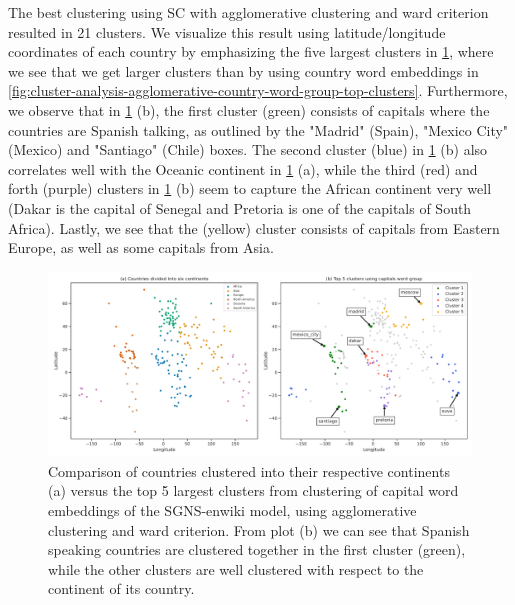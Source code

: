 The best clustering using SC with agglomerative clustering and ward criterion resulted in 21 clusters. We visualize this result using latitude/longitude coordinates of each country by emphasizing the five largest clusters in \cref{fig:cluster-analysis-agglomerative-country-capitals-word-group-top-clusters}, where we see that we get larger clusters than by using country word embeddings in \cref{fig:cluster-analysis-agglomerative-country-word-group-top-clusters}. Furthermore, we observe that in \cref{fig:cluster-analysis-agglomerative-country-capitals-word-group-top-clusters} (b), the first cluster (green) consists of capitals where the countries are Spanish talking, as outlined by the "Madrid" (Spain), "Mexico City" (Mexico) and "Santiago" (Chile) boxes. The second cluster (blue) in \cref{fig:cluster-analysis-agglomerative-country-capitals-word-group-top-clusters} (b) also correlates well with the Oceanic continent in \cref{fig:cluster-analysis-agglomerative-country-capitals-word-group-top-clusters} (a), while the third (red) and forth (purple) clusters in \cref{fig:cluster-analysis-agglomerative-country-capitals-word-group-top-clusters} (b) seem to capture the African continent very well (Dakar is the capital of Senegal and Pretoria is one of the capitals of South Africa). Lastly, we see that the (yellow) cluster consists of capitals from Eastern Europe, as well as some capitals from Asia.
\begin{figure}[H]
    \centering
    \includegraphics[width=\textwidth]{thesis/figures/cluster-analysis-agglomerative-country-capitals-word-group-top-clusters.pdf}
    \caption{Comparison of countries clustered into their respective continents (a) versus the top 5 largest clusters from clustering of capital word embeddings of the SGNS-enwiki model, using agglomerative clustering and ward criterion. From plot (b) we can see that Spanish speaking countries are clustered together in the first cluster (green), while the other clusters are well clustered with respect to the continent of its country.}
    \label{fig:cluster-analysis-agglomerative-country-capitals-word-group-top-clusters}
\end{figure}

